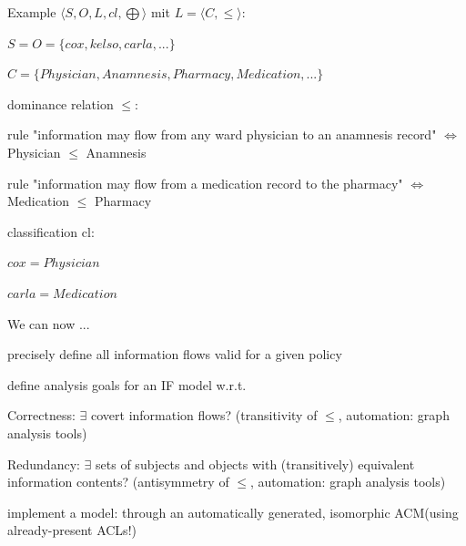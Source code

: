 \documentclass[a4paper]{article}
\begin{document}
\begin{multicols}{3}
    Example $⟨S,O,L,cl,\bigoplus⟩$ mit $L=⟨C,\leq⟩$:
    \begin{itemize*}
        \item $S=O=\{cox,kelso,carla,...\}$
        \item $C=\{Physician, Anamnesis, Pharmacy, Medication,...\}$
        \item dominance relation $\leq$:
        \begin{itemize*}
            \item rule "information may flow from any ward physician to an anamnesis record" $\Leftrightarrow$ Physician $\leq$ Anamnesis
            \item rule "information may flow from a medication record to the pharmacy" $\Leftrightarrow$ Medication $\leq$ Pharmacy
        \end{itemize*}
        \item classification cl:
        \begin{itemize*}
            \item $cox=Physician$
            \item $carla=Medication$
        \end{itemize*}
    \end{itemize*}

    We can now ...
    \begin{itemize*}
        \item precisely define all information flows valid for a given policy
        \item define analysis goals for an IF model w.r.t.
        \begin{itemize*}
            \item Correctness: $\exists$ covert information flows? (transitivity of $\leq$, automation: graph analysis tools)
            \item Redundancy: $\exists$ sets of subjects and objects with (transitively) equivalent information contents? (antisymmetry of $\leq$, automation: graph analysis tools)
        \end{itemize*}
        \item implement a model: through an automatically generated, isomorphic ACM(using already-present ACLs!)
    \end{itemize*}



\end{multicols}
\end{document}
